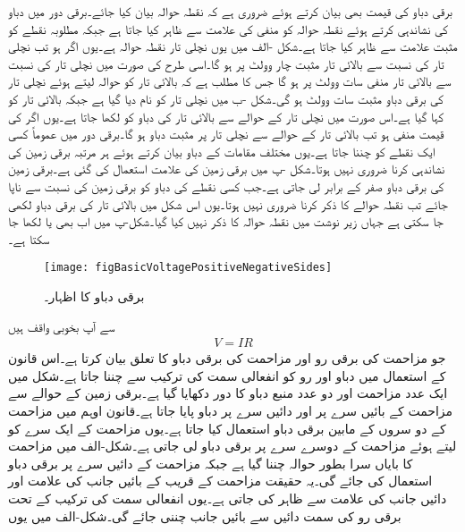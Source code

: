 برقی دباو کی قیمت بھی بیان کرتے ہوئے ضروری ہے کہ نقطہ حوالہ بیان کیا جائے۔برقی دور میں دباو کی نشاندہی کرتے ہوئے نقطہ حوالہ کو منفی کی علامت  سے ظاہر کیا جاتا ہے جبکہ مطلوبہ نقطے کو مثبت علامت  سے ظاہر کیا جاتا ہے۔شکل -الف میں یوں نچلی تار نقطہ حوالہ ہے۔یوں اگر  ہو تب نچلی تار کی نسبت سے بالائی تار مثبت چار وولٹ پر ہو گا۔اسی طرح  کی صورت میں نچلی تار کی نسبت سے بالائی تار منفی سات وولٹ پر ہو گا جس کا مطلب ہے کہ بالائی تار کو حوالہ لیتے ہوئے نچلی تار کی برقی دباو مثبت سات وولٹ ہو گی۔شکل  -ب میں نچلی تار کو  نام دیا گیا ہے جبکہ بالائی تار کو  کہا گیا ہے۔اس صورت میں نچلی تار کے حوالے سے بالائی تار کی دباو کو  لکھا جاتا ہے۔یوں اگر  کی قیمت منفی ہو تب بالائی تار کے حوالے سے نچلی تار پر مثبت دباو ہو گا۔برقی دور میں عموماً کسی ایک نقطے کو  چننا جاتا ہے۔یوں مختلف مقامات کے دباو بیان کرتے ہوئے ہر مرتبہ برقی زمین کی نشاندہی کرنا ضروری نہیں ہوتا۔شکل -پ میں برقی زمین کی علامت استعمال کی گئی ہے۔برقی زمین کی برقی دباو صفر کے برابر لی جاتی ہے۔جب کسی نقطے کی دباو کو برقی زمین کی نسبت سے ناپا جائے تب نقطہ حوالے کا ذکر کرنا ضروری نہیں ہوتا۔یوں اس شکل میں بالائی تار کی برقی دباو  لکھی جا سکتی ہے  جہاں زیر نوشت میں نقطہ حوالہ کا ذکر نہیں کیا گیا۔شکل-پ میں اب بھی  یا  لکھا جا سکتا ہے۔
\begin{figure}
\centering
\texttt{[image: figBasicVoltagePositiveNegativeSides]}
\caption{برقی دباو کا اظہار۔}
\label{شکل_بنیادی_دباو_کا_اظہار}
\end{figure}
%
 سے آپ بخوبی واقف ہیں
\begin{align}
V=I R
\end{align}
جو مزاحمت کی برقی رو اور مزاحمت کی برقی دباو کا تعلق بیان کرتا ہے۔اس قانون کے استعمال میں دباو  اور رو  کو انفعالی سمت کی ترکیب سے چننا جاتا ہے۔شکل  میں ایک عدد مزاحمت اور دو عدد منبع دباو کا دور دکھایا گیا ہے۔برقی زمین کے حوالے سے مزاحمت کے بائیں سرے پر  اور دائیں سرے پر  دباو پایا جاتا ہے۔قانون اوہم میں مزاحمت کے دو سروں کے مابین برقی دباو استعمال کیا جاتا ہے۔یوں مزاحمت کے ایک سرے کو  لیتے ہوئے مزاحمت کے دوسرے سرے پر برقی دباو لی جاتی ہے۔شکل-الف میں مزاحمت کا بایاں سرا بطور حوالہ چننا گیا ہے جبکہ مزاحمت کے دائیں سرے پر برقی دباو استعمال کی جائے گی۔یہ حقیقت مزاحمت کے قریب  کے بائیں جانب  کی علامت اور دائیں جانب   کی علامت سے ظاہر کی جاتی ہے۔یوں انفعالی سمت کی ترکیب کے تحت برقی رو کی سمت دائیں سے بائیں جانب چننی جائے گی۔شکل-الف میں یوں

